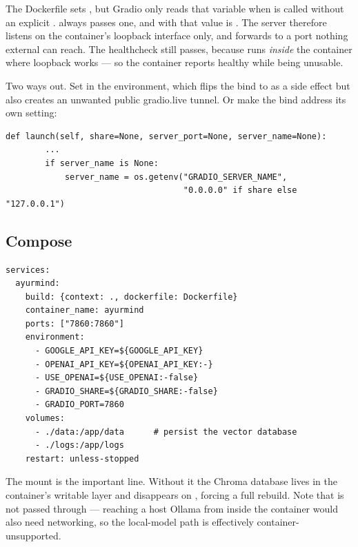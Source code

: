 \begin{bug}[title={The container binds to localhost and is unreachable}]
The Dockerfile sets , but Gradio only reads that variable when  is called without an explicit .  always passes one, and with  that value is . The server therefore listens on the container's loopback interface only, and  forwards to a port nothing external can reach. The healthcheck still passes, because  runs \emph{inside} the container where loopback works --- so the container reports healthy while being unusable.

Two ways out. Set  in the environment, which flips the bind to  as a side effect but also creates an unwanted public gradio.live tunnel. Or make the bind address its own setting:

\begin{lstlisting}[style=py]
    def launch(self, share=None, server_port=None, server_name=None):
        ...
        if server_name is None:
            server_name = os.getenv("GRADIO_SERVER_NAME",
                                    "0.0.0.0" if share else "127.0.0.1")
\end{lstlisting}
\end{bug}

\subsection{Compose}

\begin{lstlisting}[style=shell]
services:
  ayurmind:
    build: {context: ., dockerfile: Dockerfile}
    container_name: ayurmind
    ports: ["7860:7860"]
    environment:
      - GOOGLE_API_KEY=${GOOGLE_API_KEY}
      - OPENAI_API_KEY=${OPENAI_API_KEY:-}
      - USE_OPENAI=${USE_OPENAI:-false}
      - GRADIO_SHARE=${GRADIO_SHARE:-false}
      - GRADIO_PORT=7860
    volumes:
      - ./data:/app/data      # persist the vector database
      - ./logs:/app/logs
    restart: unless-stopped
\end{lstlisting}

The  mount is the important line. Without it the Chroma database lives in the container's writable layer and disappears on , forcing a full rebuild. Note that  is not passed through --- reaching a host Ollama from inside the container would also need  networking, so the local-model path is effectively container-unsupported.

